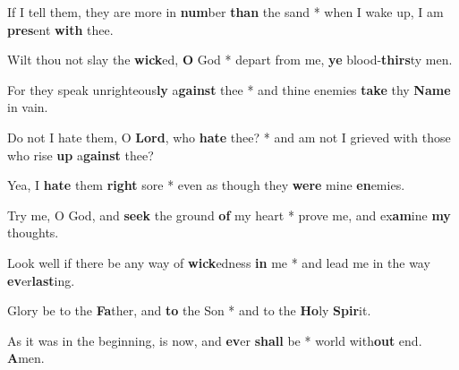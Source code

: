 \begin{multicols}{2}
	If I tell them, they are more in \textbf{num}ber \textbf{than} the sand * when I wake up, I am \textbf{pres}ent \textbf{with} thee.
	
	Wilt thou not slay the \textbf{wick}ed, \textbf{O} God * depart from me, \textbf{ye} blood-\textbf{thirs}ty men.
	
	For they speak unrighteous\textbf{ly} a\textbf{gainst} thee * and thine enemies \textbf{take} thy \textbf{Name} in vain.
	
	Do not I hate them, O \textbf{Lord}, who \textbf{hate} thee? * and am not I grieved with those who rise \textbf{up} a\textbf{gainst} thee?
	
	Yea, I \textbf{hate} them \textbf{right} sore * even as though they \textbf{were} mine \textbf{en}emies.
	
	Try me, O God, and \textbf{seek} the ground \textbf{of} my heart * prove me, and ex\textbf{am}ine \textbf{my} thoughts.
	
	Look well if there be any way of \textbf{wick}edness \textbf{in} me * and lead me in the way \textbf{ev}er\textbf{last}ing.
	
	Glory be to the \textbf{Fa}ther, and \textbf{to} the Son * and to the \textbf{Ho}ly \textbf{Spir}it.
	
	As it was in the beginning, is now, and \textbf{ev}er \textbf{shall} be * world with\textbf{out} end. \textbf{A}men.
\end{multicols}